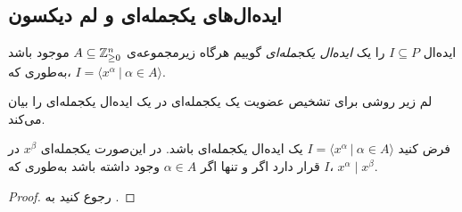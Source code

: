 \subsection*{ایده‌ال‌های یکجمله‌ای و لم دیکسون}
\begin{definition}
ایده‌ال 
$I\subseteq P$
را یک 
\textit{ایده‌ال یکجمله‌ای}
گوییم  هرگاه زیرمجموعه‌ی 
$A\subseteq\mathbb{Z}_{\geq 0}^{n}$
موجود باشد به‌طوری  که، 
$I = \langle x^{\alpha} \ | \ \alpha\in A\rangle$.
\end{definition}
لم زیر روشی   برای تشخیص عضویت  یک یکجمله‌ای در یک ایده‌ال یکجمله‌ای  را بیان می‌کند.
\begin{lemma}
\label{monoideal_membering lemma}
فرض کنید 
$I = \langle x^{\alpha} \ | \ \alpha\in A\rangle$
 یک ایده‌ال یکجمله‌ای باشد. در این‌صورت  یکجمله‌ای 
 $x^{\beta}$
 در 
 $I$
 قرار  دارد اگر و تنها اگر 
 $\alpha\in A$
 وجود داشته باشد به‌طوری  که، 
 $x^{\alpha}\mid x^{\beta}$.

\end{lemma}
\begin{proof}
رجوع کنید به 
{\small \cite{IVAcox}}.
\end{proof}

